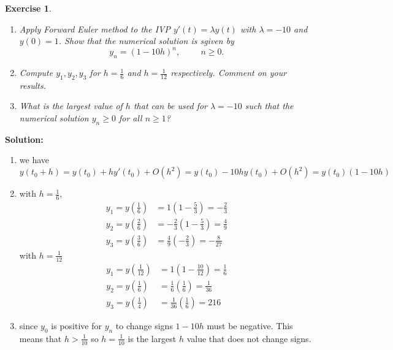 \documentclass[a4paper,12pt]{scrartcl} %
\newenvironment{solution}
  {\par\color{answercolor}\textbf{Solution:}\ }
  {\par}
\newcounter{customcounter}
\theoremstyle{darktheorem}
\newtheorem{exercise}[customcounter]{Exercise}
\begin{document}
\begin{exercise}
    \begin{enumerate}
        \item Apply Forward Euler method to the IVP $y'(t) = \lambda y(t)$ with $\lambda = -10$ and 
            $y(0) = 1$. Show that the numerical solution is sgiven by
            \[
                y_n = (1-10h)^{n}, \hspace{1cm} n \ge 0
            .\] 
        \item Compute $y_1,y_2,y_3$ for $h = \frac{1}{6}$ and $h=\frac{1}{12}$ respectively.
            Comment on your results.
        \item What is the largest value of $h$ that can be used for $\lambda = -10$ such that the numerical solution
            $y_n \ge 0$ for all $n \ge 1$?
    \end{enumerate}
\end{exercise}
\begin{solution}
    \begin{enumerate}
        \item we have $y(t_0+h) = y(t_0) + hy'(t_0) + O(h^2) = y(t_0) -10hy(t_0) + O(h^2) = y(t_0)(1-10h) $
        \item 
            with $h = \frac{1}{6}$,
            \begin{align*}
                y_1 = y(\frac{1}{6}) &= 1(1-\frac{5}{3}) = -\frac{2}{3}\\
                y_2 = y(\frac{2}{6}) &= -\frac{2}{3}(1-\frac{5}{3}) = \frac{4}{9}\\
                y_3 = y(\frac{3}{6}) &= \frac{4}{9}(-\frac{2}{3}) = -\frac{8}{27} 
            \end{align*}
            with $h = \frac{1}{12}$ 
            \begin{align*}
                y_1 = y(\frac{1}{12}) &= 1(1-\frac{10}{12}) = \frac{1}{6}\\
                y_2 = y(\frac{1}{6}) &= \frac{1}{6}(\frac{1}{6}) = \frac{1}{36}\\
                y_3 = y(\frac{1}{4}) &= \frac{1}{36}(\frac{1}{6}) = 216
            \end{align*}
        \item since $y_0$ is positive for $y_n$ to change signs $1-10h$ must be negative. This means that $h > \frac{1}{10}$ so $h = \frac{1}{10}$ 
            is the largest $h$ value that does not change signs. 
    \end{enumerate}
\end{solution}
\end{document}

